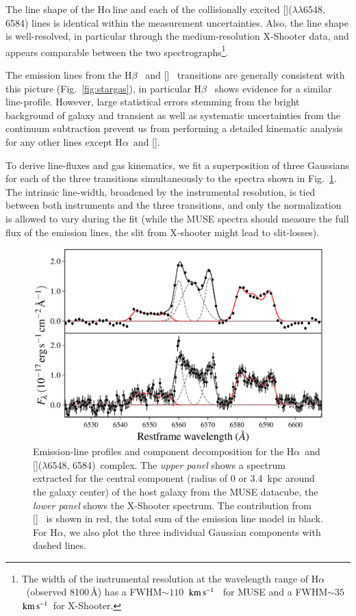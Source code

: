 \documentclass[traditabstract]{aa}
\newcommand{\kms}{$\rm{km\,s^{-1}}$}
\newcommand{\hb}{H$\beta$}
\newcommand{\ha}{H$\alpha$}
\newcommand{\oiii}{[\ion{O}{iii}]}
\newcommand{\nii}{[\ion{N}{ii}]}
\begin{document}
The line shape of the \ha\,line and each of the collisionally excited \nii($\lambda\lambda$6548, 6584) lines is identical within the measurement uncertainties. Also, the line shape is well-resolved, in particular through the medium-resolution X-Shooter data, and appears comparable between the two spectrographs\footnote{The width of the instrumental resolution at the wavelength range of \ha~(observed 8100\,\AA) has a FWHM$\sim110$~\kms~ for MUSE and a FWHM$\sim35$~\kms~for X-Shooter.}.

The emission lines from the \hb~ and \oiii~ transitions are generally consistent with this picture (Fig.~\ref{fig:stargas}), in particular \hb~ shows evidence for a similar line-profile. However, large statistical errors stemming from the bright background of galaxy and transient as well as systematic uncertainties from the continuum subtraction prevent us from performing a detailed kinematic analysis for any other lines except \ha~and \nii.

To derive line-fluxes and gas kinematics, we fit a superposition of three Gaussians for each of the three transitions simultaneously to the spectra shown in Fig.~\ref{fig:hanii}. The intrinsic line-width, broadened by the instrumental resolution, is tied between both instruments and the three transitions, and only the normalization is allowed to vary during the fit (while the MUSE spectra should measure the full flux of the emission lines, the slit from X-shooter might lead to slit-losses). %
\begin{figure}
  \includegraphics[width=0.999\linewidth]{fig/MUSE_XS_lineshape.pdf}
\caption{Emission-line profiles and component decomposition for the \ha\, and \nii($\lambda$6548, 6584)\, complex. The \textit{upper panel} shows a spectrum extracted for the central component (radius of 0 or 3.4~kpc around the galaxy center) of the host galaxy from the MUSE datacube, the \textit{lower panel} shows the X-Shooter spectrum. The contribution from \nii~ is shown in red, the total sum of the emission line model in black. For \ha, we also plot the three individual Gaussian components with dashed lines.}
\label{fig:hanii}
\end{figure}
\end{document}
